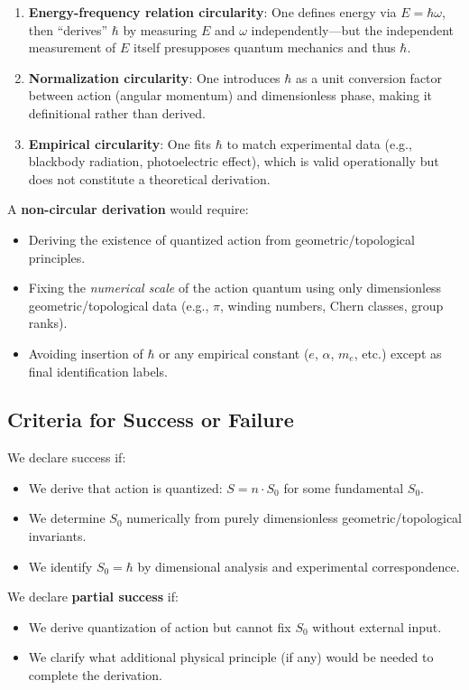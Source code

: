 \documentclass[12pt]{article}
\begin{document}
\begin{enumerate}
\item \textbf{Energy-frequency relation circularity}: One defines energy via $E = \hbar\omega$, then ``derives'' $\hbar$ by measuring $E$ and $\omega$ independently---but the independent measurement of $E$ itself presupposes quantum mechanics and thus $\hbar$.

\item \textbf{Normalization circularity}: One introduces $\hbar$ as a unit conversion factor between action (angular momentum) and dimensionless phase, making it definitional rather than derived.

\item \textbf{Empirical circularity}: One fits $\hbar$ to match experimental data (e.g., blackbody radiation, photoelectric effect), which is valid operationally but does not constitute a theoretical derivation.
\end{enumerate}

A \textbf{non-circular derivation} would require:
\begin{itemize}
\item Deriving the existence of quantized action from geometric/topological principles.
\item Fixing the \emph{numerical scale} of the action quantum using only dimensionless geometric/topological data (e.g., $\pi$, winding numbers, Chern classes, group ranks).
\item Avoiding insertion of $\hbar$ or any empirical constant ($e$, $\alpha$, $m_e$, etc.) except as final identification labels.
\end{itemize}

\subsection{Criteria for Success or Failure}

We declare success if:
\begin{itemize}
\item We derive that action is quantized: $S = n \cdot S_0$ for some fundamental $S_0$.
\item We determine $S_0$ numerically from purely dimensionless geometric/topological invariants.
\item We identify $S_0 = \hbar$ by dimensional analysis and experimental correspondence.
\end{itemize}

We declare \textbf{partial success} if:
\begin{itemize}
\item We derive quantization of action but cannot fix $S_0$ without external input.
\item We clarify what additional physical principle (if any) would be needed to complete the derivation.
\end{itemize}
\end{document}
